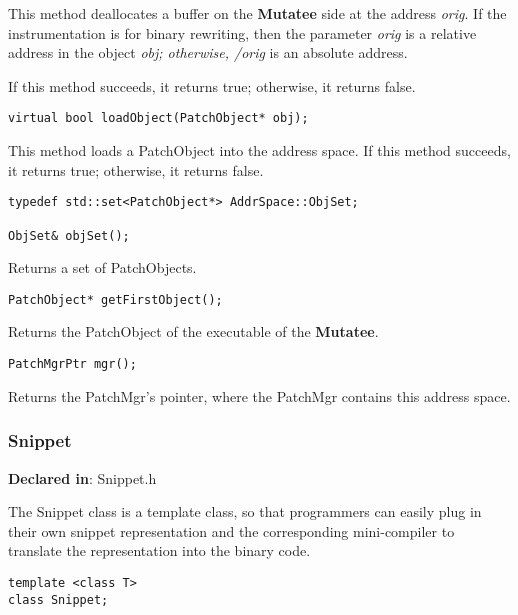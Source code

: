 This method deallocates a buffer on the \textbf{Mutatee} side at the address \emph{orig}.
If the instrumentation is for binary rewriting, then the parameter \emph{orig} is a
relative address in the object \emph{obj; otherwise, /orig} is an absolute address.

If this method succeeds, it returns true; otherwise, it returns false.


\begin{verbatim}
virtual bool loadObject(PatchObject* obj);

\end{verbatim}



This method loads a PatchObject into the address space. If this method succeeds, it
returns true; otherwise, it returns false.


\begin{verbatim}
typedef std::set<PatchObject*> AddrSpace::ObjSet;

ObjSet& objSet();

\end{verbatim}



Returns a set of PatchObjects.


\begin{verbatim}
PatchObject* getFirstObject();

\end{verbatim}



Returns the PatchObject of the executable of the \textbf{Mutatee}.


\begin{verbatim}
PatchMgrPtr mgr();

\end{verbatim}



Returns the PatchMgr's pointer, where the PatchMgr contains this address space.

\subsubsection{Snippet}
\label{sec-3.2.2}

\textbf{Declared in}: Snippet.h

The Snippet class is a template class, so that programmers can easily plug in
their own snippet representation and the corresponding mini-compiler to
translate the representation into the binary code.


\begin{verbatim}
template <class T>
class Snippet;

\end{verbatim}



